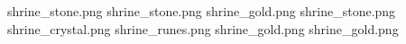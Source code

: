 shrine_stone.png
shrine_stone.png
shrine_gold.png
shrine_stone.png
shrine_crystal.png
shrine_runes.png
shrine_gold.png
shrine_gold.png
